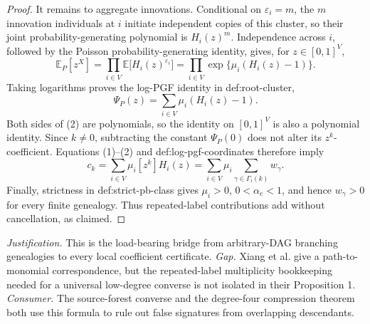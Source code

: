 \documentclass{article}
\begin{document}
\begin{proof}
It remains to aggregate innovations.  Conditional on \(\varepsilon_i=m\), the \(m\) innovation individuals at \(i\) initiate independent copies of this cluster, so their joint probability-generating polynomial is \(H_i(z)^m\).  Independence across \(i\), followed by the Poisson probability-generating identity, gives, for \(z\in[0,1]^V\),
\[
 \mathbb E_P[z^X]
 =\prod_{i\in V}\mathbb E\bigl[H_i(z)^{\varepsilon_i}\bigr]
 =\prod_{i\in V}\exp\{\mu_i(H_i(z)-1)\}.
\]
Taking logarithms proves the log-PGF identity in def:root-cluster,
\[
 \Psi_P(z)=\sum_{i\in V}\mu_i(H_i(z)-1).
\tag{2}
\]
Both sides of (2) are polynomials, so the identity on \([0,1]^V\) is also a polynomial identity.  Since \(k\ne0\), subtracting the constant \(\Psi_P(0)\) does not alter its \(z^k\)-coefficient.  Equations (1)--(2) and def:log-pgf-coordinates therefore imply
\[
 c_k
 =\sum_{i\in V}\mu_i[z^k]H_i(z)
 =\sum_{i\in V}\mu_i\sum_{\gamma\in\Gamma_i(k)}w_\gamma.
\]
Finally, strictness in def:strict-pb-class gives \(\mu_i>0\), \(0<\alpha_e<1\), and hence \(w_\gamma>0\) for every finite genealogy.  Thus repeated-label contributions add without cancellation, as claimed.
\end{proof}
\par\smallskip\noindent \textit{Justification.} This is the load-bearing bridge from arbitrary-DAG branching genealogies to every local coefficient certificate. \textit{Gap.} Xiang et al. give a path-to-monomial correspondence, but the repeated-label multiplicity bookkeeping needed for a universal low-degree converse is not isolated in their Proposition 1. \textit{Consumer.} The source-forest converse and the degree-four compression theorem both use this formula to rule out false signatures from overlapping descendants.
\end{document}
